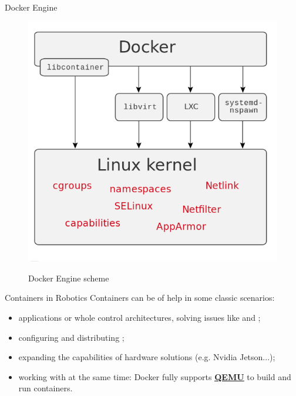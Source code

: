 \begin{frame}{Docker Engine}
\begin{figure}
  \centering
  \includegraphics[scale=.3]{dockerScheme.png}
  \label{fig:dockerscheme}
  \caption{Docker Engine scheme}
\end{figure}
\end{frame}

\begin{frame}{Containers in Robotics}
Containers can be of help in some classic scenarios:
\begin{itemize}
  \item {} applications or whole control architectures, solving issues like  and ;
  \item configuring and distributing ;
  \item expanding the capabilities of  hardware solutions (e.g. Nvidia Jetson...);
  \item working with  at the same time: Docker fully supports \href{https://www.qemu.org/}{\color{blue}\textbf{\underline{QEMU}}} to build and run containers.
\end{itemize}
\end{frame}

